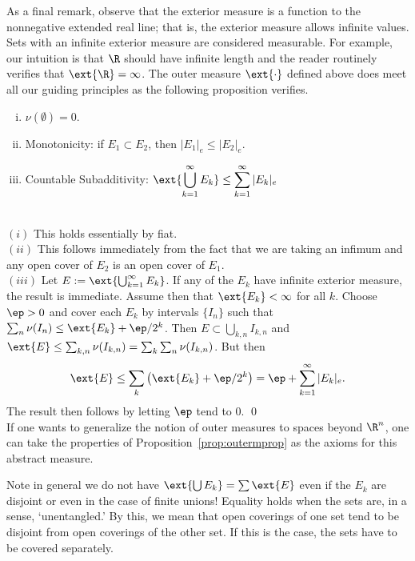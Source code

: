 As a final remark, observe that the exterior measure is a function to the nonnegative extended real line; that is, the exterior measure allows infinite values. Sets with an infinite exterior measure are considered measurable. For example, our intuition is that $\R$ should have infinite length and the reader routinely verifies that $\ext{\R}=\infty$. The outer measure $\ext{\cdot}$ defined above does meet all our guiding principles as the following proposition verifies. 

\begin{prop} \label{prop:outermprop} \hfill
	\begin{enumerate}[(i)]
	\item $\nu(\emptyset)=0$.
	\item Monotonicity: if $E_1 \subset E_2$, then $|E_1|_e \leq |E_2|_e$.
	\item Countable Subadditivity: $\displaystyle \ext{\bigcup_{k=1}^\infty E_k} \leq \sum_{k=1}^\infty |E_k|_e$
	\end{enumerate}
\end{prop}

\pf \\
\noindent$(i)$ This holds essentially by fiat. \\

\noindent$(ii)$ This follows immediately from the fact that we are taking an infimum and any open cover of $E_2$ is an open cover of $E_1$. \\

\noindent$(iii)$ Let $E:=\ext{\bigcup_{k=1}^\infty E_k}$. If any of the $E_k$ have infinite exterior measure, the result is immediate. Assume then that $\ext{E_k}<\infty$ for all $k$. Choose $\ep>0$ and cover each $E_k$ by intervals $\{I_n\}$ such that $\sum_n \nu(I_n) \leq \ext{E_k} + \ep/2^k$. Then $E \subset \bigcup_{k,n} I_{k,n}$ and $\ext{E} \leq \sum_{k,n} \nu(I_{k,n})= \sum_k \sum_n \nu(I_{k,n})$. But then 
	\[
	\ext{E} \leq \sum_k \left( \ext{E_k} + \ep/2^k \right)= \ep + \sum_{k=1}^\infty |E_k|_e.
	\]
The result then follows by letting $\ep$ tend to 0. \qed \\


\noindent If one wants to generalize the notion of outer measures to spaces beyond $\R^n$, one can take the properties of Proposition~\ref{prop:outermprop} as the axioms for this abstract measure. 


Note in general we do not have $\ext{\bigcup E_k}= \sum \ext{E}$ even if the $E_k$ are disjoint or even in the case of finite unions! Equality holds when the sets are, in a sense, `unentangled.' By this, we mean that open coverings of one set tend to be disjoint from open coverings of the other set. If this is the case, the sets have to be covered separately. 

